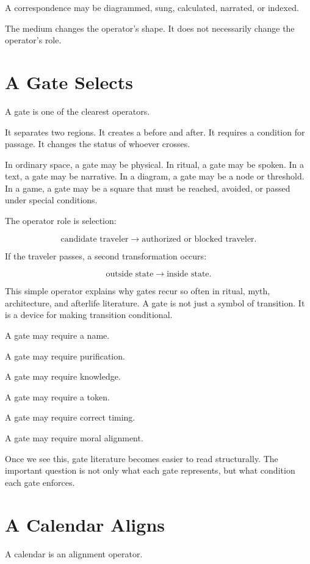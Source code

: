 \documentclass[11pt]{book}
\begin{document}
A correspondence may be diagrammed, sung, calculated, narrated, or indexed.

The medium changes the operator's shape. It does not necessarily change the operator's role.

\section{A Gate Selects}

A gate is one of the clearest operators.

It separates two regions. It creates a before and after. It requires a condition for passage. It changes the status of whoever crosses.

In ordinary space, a gate may be physical. In ritual, a gate may be spoken. In a text, a gate may be narrative. In a diagram, a gate may be a node or threshold. In a game, a gate may be a square that must be reached, avoided, or passed under special conditions.

The operator role is selection:

\[
\text{candidate traveler} 
\longrightarrow 
\text{authorized or blocked traveler}.
\]

If the traveler passes, a second transformation occurs:

\[
\text{outside state}
\longrightarrow
\text{inside state}.
\]

This simple operator explains why gates recur so often in ritual, myth, architecture, and afterlife literature. A gate is not just a symbol of transition. It is a device for making transition conditional.

A gate may require a name.

A gate may require purification.

A gate may require knowledge.

A gate may require a token.

A gate may require correct timing.

A gate may require moral alignment.

Once we see this, gate literature becomes easier to read structurally. The important question is not only what each gate represents, but what condition each gate enforces.

\section{A Calendar Aligns}

A calendar is an alignment operator.
\end{document}
